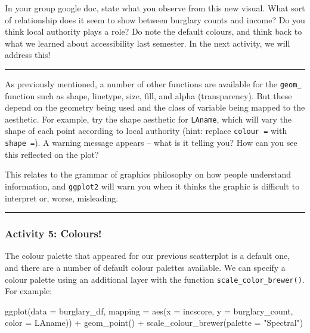 \documentclass[
]{book}
\newenvironment{Shaded}{\begin{snugshade}}{\end{snugshade}}
\newcommand{\AttributeTok}[1]{\textcolor[rgb]{0.77,0.63,0.00}{#1}}
\newcommand{\FunctionTok}[1]{\textcolor[rgb]{0.00,0.00,0.00}{#1}}
\newcommand{\NormalTok}[1]{#1}
\newcommand{\SpecialCharTok}[1]{\textcolor[rgb]{0.00,0.00,0.00}{#1}}
\newcommand{\StringTok}[1]{\textcolor[rgb]{0.31,0.60,0.02}{#1}}
\begin{document}
In your group google doc, state what you observe from this new visual. What sort of relationship does it seem to show between burglary counts and income? Do you think local authority plays a role? Do note the default colours, and think back to what we learned about accessibility last semester. In the next activity, we will address this!

\begin{center}\rule{0.5\linewidth}{0.5pt}\end{center}

As previously mentioned, a number of other functions are available for the \texttt{geom\_} function such as shape, linetype, size, fill, and alpha (transparency). But these depend on the geometry being used and the class of variable being mapped to the aesthetic. For example, try the shape aesthetic for \texttt{LAname}, which will vary the shape of each point according to local authority (hint: replace \texttt{colour\ =} with \texttt{shape\ =}). A warning message appears -- what is it telling you? How can you see this reflected on the plot?

This relates to the grammar of graphics philosophy on how people understand information, and \texttt{ggplot2} will warn you when it thinks the graphic is difficult to interpret or, worse, misleading.

\begin{center}\rule{0.5\linewidth}{0.5pt}\end{center}

\hypertarget{activity-5-colours}{%
\subsubsection{Activity 5: Colours!}\label{activity-5-colours}}

The colour palette that appeared for our previous scatterplot is a default one, and there are a number of default colour palettes available. We can specify a colour palette using an additional layer with the function \texttt{scale\_color\_brewer()}. For example:

\begin{Shaded}
\begin{Highlighting}[]
\FunctionTok{ggplot}\NormalTok{(}\AttributeTok{data =}\NormalTok{ burglary\_df, }\AttributeTok{mapping =} \FunctionTok{aes}\NormalTok{(}\AttributeTok{x =}\NormalTok{ incscore, }\AttributeTok{y =}\NormalTok{ burglary\_count, }\AttributeTok{color =}\NormalTok{ LAname)) }\SpecialCharTok{+} 
  \FunctionTok{geom\_point}\NormalTok{() }\SpecialCharTok{+} 
  \FunctionTok{scale\_colour\_brewer}\NormalTok{(}\AttributeTok{palette =} \StringTok{"Spectral"}\NormalTok{)}
\end{Highlighting}
\end{Shaded}
\end{document}
